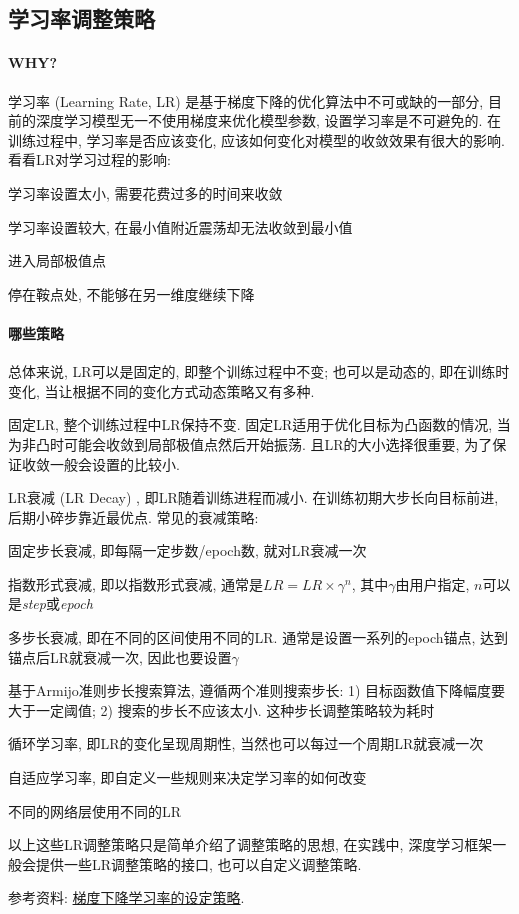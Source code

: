 \subsection{学习率调整策略}
\paragraph{WHY?}学习率 (Learning Rate, LR) 是基于梯度下降的优化算法中不可或缺的一部分, 目前的深度学习模型无一不使用梯度来优化模型参数, 设置学习率是不可避免的. 在训练过程中, 学习率是否应该变化, 应该如何变化对模型的收敛效果有很大的影响. 看看LR对学习过程的影响: 
\begin{myitemize}
	\item 学习率设置太小, 需要花费过多的时间来收敛
	\item 学习率设置较大, 在最小值附近震荡却无法收敛到最小值
	\item 进入局部极值点
	\item 停在鞍点处, 不能够在另一维度继续下降
\end{myitemize}

\paragraph{哪些策略}总体来说, LR可以是固定的, 即整个训练过程中不变; 也可以是动态的, 即在训练时变化, 当让根据不同的变化方式动态策略又有多种. 
\begin{myitemize}
	\item 固定LR, 整个训练过程中LR保持不变. 固定LR适用于优化目标为凸函数的情况, 当为非凸时可能会收敛到局部极值点然后开始振荡. 且LR的大小选择很重要, 为了保证收敛一般会设置的比较小. 
	\item LR衰减 (LR Decay) , 即LR随着训练进程而减小. 在训练初期大步长向目标前进, 后期小碎步靠近最优点. 常见的衰减策略: 
	\begin{myitemize}
		\item 固定步长衰减, 即每隔一定步数/epoch数, 就对LR衰减一次
		\item 指数形式衰减, 即以指数形式衰减, 通常是$LR = LR \times \gamma^{n}$, 其中$\gamma$由用户指定, $n$可以是\textit{step}或\textit{epoch}
		\item 多步长衰减, 即在不同的区间使用不同的LR. 通常是设置一系列的epoch锚点, 达到锚点后LR就衰减一次, 因此也要设置$\gamma$
	\end{myitemize}
	\item 基于Armijo准则步长搜索算法, 遵循两个准则搜索步长: 1) 目标函数值下降幅度要大于一定阈值; 2) 搜索的步长不应该太小. 这种步长调整策略较为耗时
	\item 循环学习率, 即LR的变化呈现周期性, 当然也可以每过一个周期LR就衰减一次
	\item 自适应学习率, 即自定义一些规则来决定学习率的如何改变
	\item 不同的网络层使用不同的LR
\end{myitemize}
以上这些LR调整策略只是简单介绍了调整策略的思想, 在实践中, 深度学习框架一般会提供一些LR调整策略的接口, 也可以自定义调整策略. 

参考资料: \href{https://lumingdong.cn/setting-strategy-of-gradient-descent-learning-rate.html}{梯度下降学习率的设定策略}. 
